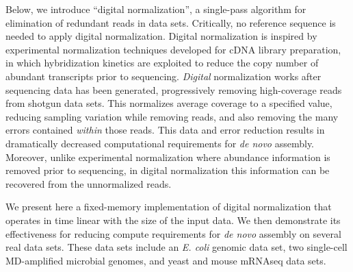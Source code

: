 \documentclass{pnastwo}
\begin{document}
\begin{article}
Below, we introduce ``digital normalization'', a single-pass algorithm
for elimination of redundant reads in data sets.  Critically, no
reference sequence is needed to apply digital normalization.  Digital
normalization is inspired by experimental normalization techniques
developed for cDNA library preparation, in which hybridization
kinetics are exploited to reduce the copy number of abundant
transcripts prior to sequencing\cite{pubmed8889548,pubmed7937745}.
{\em Digital} normalization works after sequencing data has been
generated, progressively removing high-coverage reads from shotgun
data sets.  This normalizes average coverage to a specified value,
reducing sampling variation while removing reads, and also removing
the many errors contained {\em within} those reads.  This data and
error reduction results in dramatically decreased computational
requirements for {\em de novo} assembly.  Moreover, unlike experimental
normalization where abundance information is removed prior to sequencing,
in digital normalization this information can be recovered from the
unnormalized reads.




We present here a fixed-memory implementation of digital normalization
that operates in time linear with the size of the input data.  We then
demonstrate its effectiveness for reducing compute requirements for
{\em de novo} assembly on several real data sets.  These data sets
include an {\em E. coli} genomic data set, two single-cell
MD-amplified microbial genomes, and yeast and mouse mRNAseq data sets.


\end{article}
\end{document}
